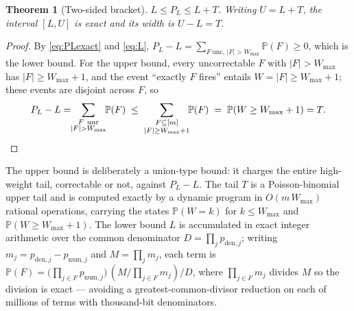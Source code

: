 \documentclass[11pt]{amsart}
\newcommand{\PL}{P_{L}}
\newcommand{\WMAX}{W_{\max}}
\newcommand{\Prb}{\mathbb{P}}
\theoremstyle{plain}
\newtheorem{theorem}{Theorem}[section]
\theoremstyle{definition}
\theoremstyle{remark}
\begin{document}
\begin{theorem}[Two-sided bracket]\label{thm:bracket}
$L\le \PL\le L+T$. Writing $U=L+T$, the interval $[L,U]$ is exact and its width
is $U-L=T$.
\end{theorem}

\begin{proof}
By \eqref{eq:PLexact} and \eqref{eq:L}, $\PL-L=\sum_{F\ \mathrm{unc},\,
|F|>\WMAX}\Prb(F)\ge 0$, which is the lower bound. For the upper bound, every
uncorrectable $F$ with $|F|>\WMAX$ has $|F|\ge \WMAX+1$, and the event ``exactly
$F$ fires'' entails $W=|F|\ge \WMAX+1$; these events are disjoint across $F$, so
\[
   \PL-L=\!\!\sum_{\substack{F\ \mathrm{unc}\\ |F|>\WMAX}}\!\!\Prb(F)
   \;\le\; \sum_{\substack{F\subseteq[m]\\ |F|\ge \WMAX+1}}\!\!\Prb(F)
   \;=\;\Prb(W\ge \WMAX+1)=T. \qedhere
\]
\end{proof}

The upper bound is deliberately a union-type bound: it charges the entire
high-weight tail, correctable or not, against $\PL-L$. The tail $T$ is a
Poisson-binomial upper tail and is computed exactly by a dynamic program in
$O(m\,\WMAX)$ rational operations, carrying the states $\Prb(W=k)$ for
$k\le\WMAX$ and $\Prb(W\ge\WMAX+1)$. The lower bound $L$ is accumulated in exact
integer arithmetic over the common denominator $D=\prod_j p_{\mathrm{den},j}$;
writing $m_j=p_{\mathrm{den},j}-p_{\mathrm{num},j}$ and $M=\prod_j m_j$, each
term is $\Prb(F)=\bigl(\prod_{j\in F}p_{\mathrm{num},j}\bigr)\,(M/\prod_{j\in
F}m_j)/D$, where $\prod_{j\in F}m_j$ divides $M$ so the division is exact ---
avoiding a greatest-common-divisor reduction on each of millions of terms with
thousand-bit denominators.
\end{document}
